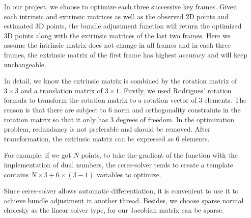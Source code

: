 \documentclass[paper=a4, fontsize=14pt]{scrartcl}
\numberwithin{equation}{section}		%
\numberwithin{figure}{section}			%
\numberwithin{table}{section}				%
\begin{document}
In our project, we choose to optimize each three successive key frames.
Given each intrinsic and extrinsic matrices as well as the observed 2D points and estimated 3D points, the bundle adjustment function will return the optimized 3D points along with the extrinsic matrices of the last two frames.
Here we assume the intrinsic matrix does not change in all frames and in each three frames, the extrinsic matrix of the first frame has highest accuracy and will keep unchangeable.

In detail, we know the extrinsic matrix is combined by the rotation matrix of $3\times3$ and a translation matrix of $3\times1$. Firstly, we used Rodrigues' rotation formula \cite{rodrigues1840lois} to transform the rotation matrix to a rotation vector of 3 elements.
The reason is that there are subject to 6 norm and orthogonality constraints in the rotation matrix so that it only has 3 degrees of freedom.
In the optimization problem, redundancy is not preferable and should be removed.
After transformation, the extrinsic matrix can be expressed as 6 elements.

For example, if we got $N$ points, to take the gradient of the function with the implementation of dual numbers, the ceres-solver tends to create a template contains $N\times3+6\times(3-1)$ variables to optimize.

Since ceres-solver allows automatic differentiation, it is convenient to use it to achieve bundle adjustment in another thread.
Besides, we choose sparse normal cholesky as the linear solver type, for our Jacobian matrix can be sparse.
\end{document}
